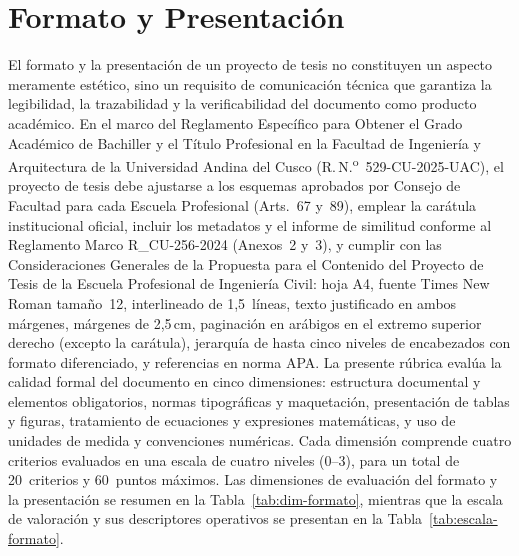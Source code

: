 \clearpage
\section{Formato y Presentación}

{\footnotesize
El formato y la presentación de un proyecto de tesis no constituyen un aspecto meramente estético, sino un requisito de comunicación técnica que garantiza la legibilidad, la trazabilidad y la verificabilidad del documento como producto académico. En el marco del Reglamento Específico para Obtener el Grado Académico de Bachiller y el Título Profesional en la Facultad de Ingeniería y Arquitectura de la Universidad Andina del Cusco (R.\,N.\textsuperscript{o}~529-CU-2025-UAC), el proyecto de tesis debe ajustarse a los esquemas aprobados por Consejo de Facultad para cada Escuela Profesional (Arts.~67 y~89), emplear la carátula institucional oficial, incluir los metadatos y el informe de similitud conforme al Reglamento Marco R\_CU-256-2024 (Anexos~2 y~3), y cumplir con las Consideraciones Generales de la Propuesta para el Contenido del Proyecto de Tesis de la Escuela Profesional de Ingeniería Civil: hoja A4, fuente Times New Roman tamaño~12, interlineado de 1,5~líneas, texto justificado en ambos márgenes, márgenes de 2,5\,cm, paginación en arábigos en el extremo superior derecho (excepto la carátula), jerarquía de hasta cinco niveles de encabezados con formato diferenciado, y referencias en norma APA. La presente rúbrica evalúa la calidad formal del documento en cinco dimensiones: estructura documental y elementos obligatorios, normas tipográficas y maquetación, presentación de tablas y figuras, tratamiento de ecuaciones y expresiones matemáticas, y uso de unidades de medida y convenciones numéricas. Cada dimensión comprende cuatro criterios evaluados en una escala de cuatro niveles (0--3), para un total de 20~criterios y 60~puntos máximos. Las dimensiones de evaluación del formato y la presentación se resumen en la Tabla~\ref{tab:dim-formato}, mientras que la escala de valoración y sus descriptores operativos se presentan en la Tabla~\ref{tab:escala-formato}.\par
}

